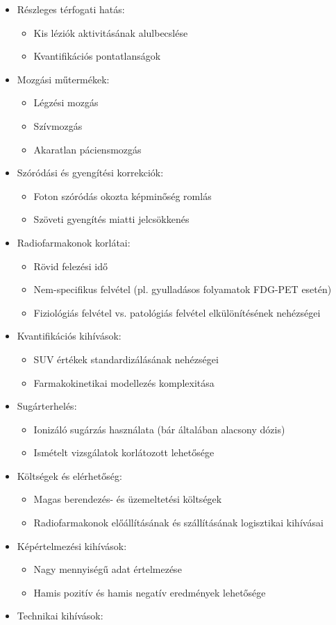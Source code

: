 \documentclass[a4paper,12pt]{article}
\begin{document}
\begin{itemize}
\item Részleges térfogati hatás: \begin{itemize} \item Kis léziók aktivitásának alulbecslése \item Kvantifikációs pontatlanságok \end{itemize} \item Mozgási műtermékek: \begin{itemize} \item Légzési mozgás \item Szívmozgás \item Akaratlan páciensmozgás \end{itemize} \item Szóródási és gyengítési korrekciók: \begin{itemize} \item Foton szóródás okozta képminőség romlás \item Szöveti gyengítés miatti jelcsökkenés \end{itemize} \item Radiofarmakonok korlátai: \begin{itemize} \item Rövid felezési idő \item Nem-specifikus felvétel (pl. gyulladásos folyamatok FDG-PET esetén) \item Fiziológiás felvétel vs. patológiás felvétel elkülönítésének nehézségei \end{itemize} \item Kvantifikációs kihívások: \begin{itemize} \item SUV értékek standardizálásának nehézségei \item Farmakokinetikai modellezés komplexitása \end{itemize} \item Sugárterhelés: \begin{itemize} \item Ionizáló sugárzás használata (bár általában alacsony dózis) \item Ismételt vizsgálatok korlátozott lehetősége \end{itemize} \item Költségek és elérhetőség: \begin{itemize} \item Magas berendezés- és üzemeltetési költségek \item Radiofarmakonok előállításának és szállításának logisztikai kihívásai \end{itemize} \item Képértelmezési kihívások: \begin{itemize} \item Nagy mennyiségű adat értelmezése \item Hamis pozitív és hamis negatív eredmények lehetősége \end{itemize} \item Technikai kihívások: 
\end{itemize}
\end{document}
